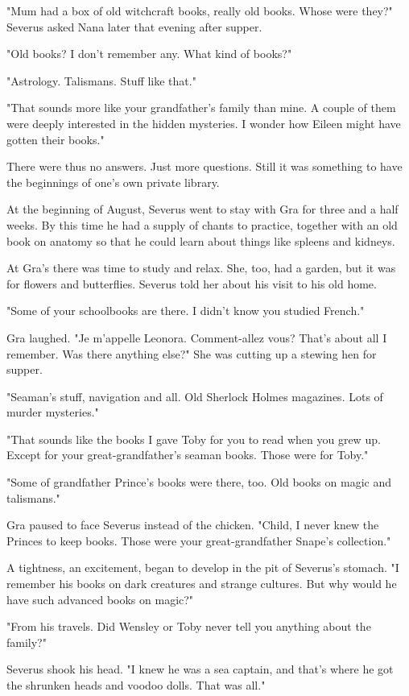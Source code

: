 \documentclass[a4paper,11pt]{article}
\begin{document}
"Mum had a box of old witchcraft books, really old books. Whose were they?" Severus asked Nana later that evening after supper.

"Old books? I don't remember any. What kind of books?"

"Astrology. Talismans. Stuff like that."

"That sounds more like your grandfather's family than mine. A couple of them were deeply interested in the hidden mysteries. I wonder how Eileen might have gotten their books."

There were thus no answers. Just more questions. Still it was something to have the beginnings of one's own private library.

At the beginning of August, Severus went to stay with Gra for three and a half weeks. By this time he had a supply of chants to practice, together with an old book on anatomy so that he could learn about things like spleens and kidneys.

At Gra's there was time to study and relax. She, too, had a garden, but it was for flowers and butterflies. Severus told her about his visit to his old home.

"Some of your schoolbooks are there. I didn't know you studied French."

Gra laughed. "Je m'appelle Leonora. Comment-allez vous? That's about all I remember. Was there anything else?" She was cutting up a stewing hen for supper.

"Seaman's stuff, navigation and all. Old Sherlock Holmes magazines. Lots of murder mysteries."

"That sounds like the books I gave Toby for you to read when you grew up. Except for your great-grandfather's seaman books. Those were for Toby."

"Some of grandfather Prince's books were there, too. Old books on magic and talismans."

Gra paused to face Severus instead of the chicken. "Child, I never knew the Princes to keep books. Those were your great-grandfather Snape's collection."

A tightness, an excitement, began to develop in the pit of Severus's stomach. "I remember his books on dark creatures and strange cultures. But why would he have such advanced books on magic?"

"From his travels. Did Wensley or Toby never tell you anything about the family?"

Severus shook his head. "I knew he was a sea captain, and that's where he got the shrunken heads and voodoo dolls. That was all."
\end{document}
